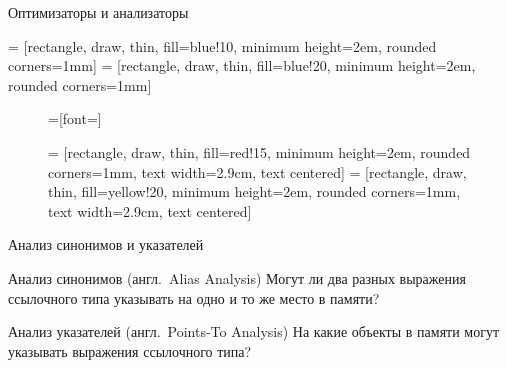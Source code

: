 \documentclass[usenames,dvipsnames,pdftex,unicode]{beamer}
\newcommand{\eng}[1]{{\English#1}}
\newcommand{\engdef}[1]{(англ.~\eng{#1})}
\begin{document}
\begin{frame}{Оптимизаторы и анализаторы}

   = [rectangle, draw, thin, fill=blue!10,%
                         minimum height=2em, rounded corners=1mm]
   =  [rectangle, draw, thin, fill=blue!20,%
                         minimum height=2em, rounded corners=1mm]

  \begin{figure}
    =[font=\small]

     = [rectangle, draw, thin, fill=red!15,
                        minimum height=2em, rounded corners=1mm,
                        text width=2.9cm, text centered]
     =  [rectangle, draw, thin, fill=yellow!20,
                        minimum height=2em, rounded corners=1mm,
                        text width=2.9cm, text centered]

  \end{figure}

\end{frame}

\begin{frame}{Анализ синонимов и указателей}

  \begin{block}{Анализ синонимов \engdef{Alias Analysis}}
    Могут ли два разных выражения ссылочного типа указывать на одно и то же
    место в памяти?
  \end{block}

  \begin{block}{Анализ указателей \engdef{Points-To Analysis}}
    На какие объекты в памяти могут указывать выражения ссылочного типа?
  \end{block}

\end{frame}
\end{document}
